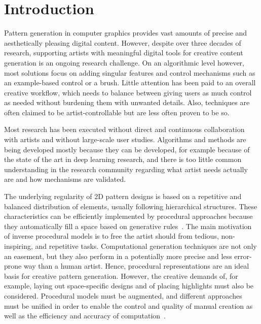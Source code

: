 \section{Introduction}
Pattern generation in computer graphics provides vast amounts of precise and aesthetically pleasing digital content. However, despite over three decades of research, supporting artists with meaningful digital tools for creative content generation is an ongoing research challenge. On an algorithmic level however, most solutions focus on adding singular features and control mechanisms such as an example-based control or a brush. Little attention has been paid to an overall creative workflow, which needs to balance between giving users as much control as needed without burdening them with unwanted details. Also, techniques are often claimed to be artist-controllable but are less often proven to be so.

Most research has been executed without direct and continuous collaboration with artists and without large-scale user studies. Algorithms and methods are being developed mostly because they can be developed, for example because of the state of the art in deep learning research, and there is too little common understanding in the research community regarding what artist needs actually are and how mechanisms are validated.

The underlying regularity of 2D pattern designs is based on a repetitive and balanced distribution of elements, usually following hierarchical structures. These characteristics can be efficiently implemented by procedural approaches because they automatically fill a space based on generative rules~\cite{stava_2010_ipm}. The main motivation of inverse procedural models is to free the artist should from tedious, non-inspiring, and repetitive tasks. Computational generation techniques are not only an easement, but they also perform in a potentially more precise and less error-prone way than a human artist. Hence, procedural representations are an ideal basis for creative pattern generation. 
However, the creative demands of, for example, laying out space-specific designs and of placing highlights must also be considered. Procedural models must be augmented, and different approaches must be unified in order to enable the control and quality of manual creation as well as the efficiency and accuracy of computation~\cite{gieseke_2017_ooo}. 


